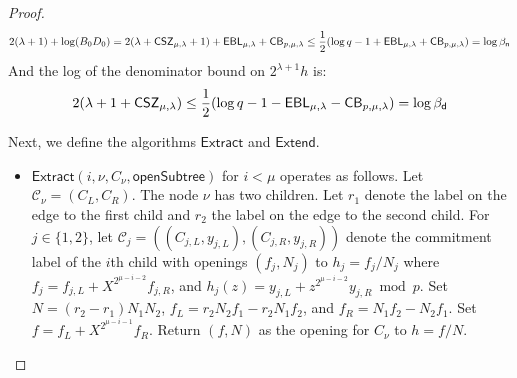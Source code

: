 \begin{proof}
$$2(\lambda + 1) + \log (B_0 D_0) = 2(\lambda + \CSZ[\mu] + 1) + \EBL[\mu] + \CorrectnessBound \leq \frac{1}{2}(\log q - 1 + \EBL[\mu] + \CorrectnessBound) = \log \beta_\textsf{n}$$ 
And the log of the denominator bound on $2^{\lambda + 1} h$ is: 
$$2(\lambda + 1 +  \CSZ[\mu]) \leq \frac{1}{2}(\log q - 1 - \EBL[\mu] - \CorrectnessBound) = \log \beta_\textsf{d}$$

Next, we define the algorithms $\textsf{Extract}$ and $\textsf{Extend}$. 

\begin{itemize} 
\item $\textsf{Extract}(i, \nu, C_\nu, \textsf{openSubtree})$ for $i < \mu$ operates as follows. Let $\mathcal{C}_\nu = (C_L, C_R)$. The node $\nu$ has two children. Let $r_1$ denote the label on the edge to the first child and $r_2$ the label on the edge to the second child. For $j \in \{1,2\}$, let $\mathcal{C}_j = ((C_{j,L}, y_{j, L}), (C_{j,R}, y_{j,R}))$ denote the commitment label of the $i$th child with openings $(f_j, N_j)$ to $h_j = f_j/N_j$ where $f_j = f_{j, L} + X^{2^{\mu - i - 2}} f_{j, R}$, and $h_j(z) = y_{j,L} + z^{2^{\mu - i -2}} y_{j,R} \bmod p$. Set $N = (r_2 - r_1) N_1 N_2$, $f_L = r_2 N_2 f_1 - r_2 N_1 f_2$, and $f_R = N_1 f_2 - N_2 f_1$. Set $f = f_L + X^{2^{\mu - i -1}} f_R$. Return $(f, N)$ as the opening for $C_\nu$ to $h = f/N$. 





\end{itemize}
\end{proof}
